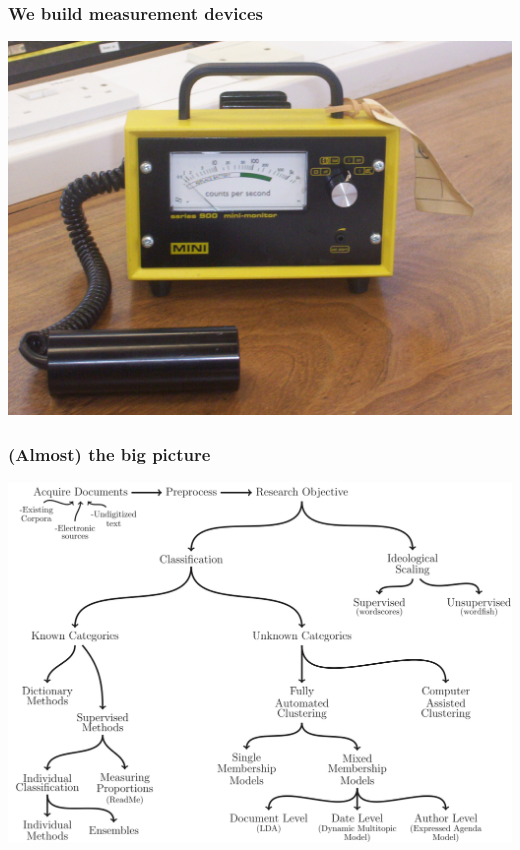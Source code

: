 \documentclass[11pt,compress,professionalfonts]{beamer}
\begin{document}
\begin{frame}[t]\frametitle{We build measurement devices}

\centerline{\includegraphics[scale=.2]{pictures/geiger_counter}}

\end{frame}
\begin{frame}[t]\frametitle{(Almost) the big picture}

\centerline{\includegraphics[scale=.5]{pictures/tad-picture}}

\end{frame}
\end{document}
